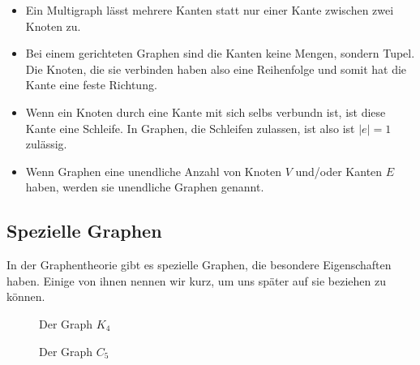 \begin{itemize}
\item {} Ein  Multigraph lässt mehrere Kanten statt nur einer Kante zwischen zwei Knoten zu.
\item {} Bei einem gerichteten Graphen sind die Kanten keine Mengen, sondern Tupel. Die Knoten, die sie verbinden haben also eine Reihenfolge und somit hat die Kante eine feste Richtung.
\item {}  Wenn ein Knoten durch eine Kante mit sich selbs verbundn ist, ist diese Kante eine Schleife. In Graphen, die Schleifen zulassen, ist also ist $|e| = 1$ zulässig.
\item {} Wenn Graphen eine unendliche Anzahl von Knoten $V$ und/oder Kanten  $E$ haben, werden sie unendliche Graphen genannt.
\end{itemize}

\subsection{Spezielle Graphen}
In der Graphentheorie gibt es spezielle Graphen, die besondere Eigenschaften haben. Einige von ihnen nennen wir kurz, um uns später auf sie beziehen zu können.


\begin{figure}
	\centering
	
	\caption{Der Graph $K_4$}
	\label{k4}
\end{figure}

\begin{figure}
	\centering
	\caption{Der Graph $C_5$}
	\label{c5}
\end{figure}

